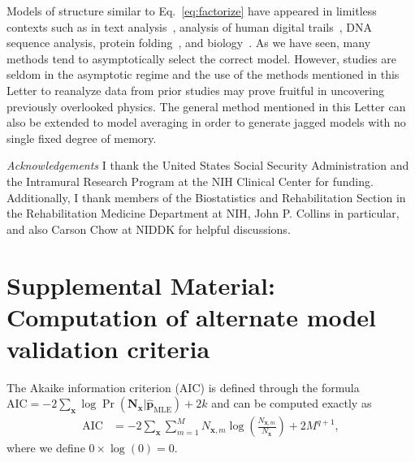 \documentclass[prl,twocolumn,groupedaddress]{revtex4-1}
\newcommand{\bN}{\mathbf{N}}
\newcommand{\bx}{\mathbf{x}}
\newcommand{\bp}{\mathbf{p}}
\begin{document}
Models of structure similar to Eq.~\ref{eq:factorize} have appeared in limitless contexts such as in text analysis~\cite{melnyk2006memory}, analysis of human digital trails~\cite{singer2014detecting}, DNA sequence analysis, protein folding~\cite{yuan1999prediction}, and biology~\cite{bettenbuhl2012bayesian}. As we have seen, many methods tend to asymptotically select the correct model. However, studies are seldom in the asymptotic regime and the use of the methods mentioned in this Letter to reanalyze data from prior studies may prove fruitful in uncovering previously overlooked physics. The general method mentioned in this Letter can also be extended to model averaging in order to generate jagged models with no single fixed degree of memory.





\emph{Acknowledgements} I thank the United States Social Security Administration and the Intramural Research Program at the NIH Clinical Center for funding. Additionally, I thank members of the Biostatistics and Rehabilitation Section in the Rehabilitation Medicine Department at NIH, John P. Collins in particular, and also Carson Chow at NIDDK for helpful discussions.




\clearpage
\newpage
\appendix

\section{Supplemental Material: Computation of alternate model validation criteria}


The Akaike information criterion (AIC) is defined through the formula $\textrm{AIC}  = -2 \sum_{\bx}\log \Pr(\bN_\bx \vert \hat{\bp}_{\textrm{MLE}}) + 2k$ and can be computed exactly as
\begin{align}
\textrm{AIC}  &= -2\sum_{\bx}\sum_{m=1}^M N_{\bx,m}\log \left( \frac{N_{\bx,m}}{N_\bx} \right)+ 2M^{q+1},
\end{align}
where we define $0\times\log(0)=0$.
\end{document}
